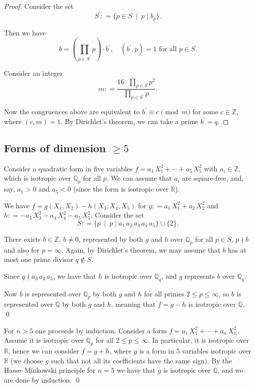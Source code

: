 \documentclass{article}
\newcommand{\dfn}{\mathrel{\mathop:}=}
\newcommand{\ZZ}{\mathbb{Z}}
\newcommand{\QQ}{\mathbb{Q}}
\theoremstyle{myplain}
\theoremstyle{mydefinition}
\begin{document}
\begin{proof}
  Consider the set
  \[ S^\prime \dfn \{ p \in S ~\mid~ p \mid b_p \}. \]

  Then we have
  \[ b = \left(\prod_{p\in S^\prime} p\right) \cdot b^\prime, \quad
    (b^\prime, p) = 1 \text{ for all } p\in S. \]

  Consider an integer
  \[ m \dfn \frac{16\cdot \prod_{p\in S} p^2}{\prod_{p\in S^\prime} p}. \]

  Now the congruences above are equivalent to $b^\prime \equiv c \pmod{m}$ for
  some $c \in \ZZ$, where $(c,m) = 1$. By Dirichlet's theorem, we can take a
  prime $b^\prime = q$.
\end{proof}

\subsection*{Forms of dimension $\ge 5$}

Consider a quadratic form in five variables
$f = a_1 \, X_1^2 + \cdots + a_5\,X_5^2$ with $a_i \in \ZZ$, which is isotropic
over $\QQ_p$ for all $p$. We can assume that $a_i$ are square-free, and, say,
$a_1 > 0$ and $a_5 < 0$ (since the form is isotropic over $\mathbb{R}$).

We have $f = g (X_1,X_2) - h (X_3,X_4,X_5)$ for $g \dfn a_1\,X_1^2 + a_2\,X_2^2$
and $h \dfn -a_3\,X_3^2 - a_4\,X_4^2 - a_5\,X_5^2$. Consider the set
\[ S \dfn \{ p ~ \mid ~ p \mid a_1 \, a_2 \, a_3 \, a_4 \, a_5 \} \cup \{ 2 \}. \]

There exists $b \in \ZZ$, $b \ne 0$, represented by both $g$ and $h$ over
$\QQ_p$ for all $p \in S$, $p \nmid b$ and also for $p = \infty$. Again, by
Dirichlet's theorem, we may assume that $b$ has at most one prime divisor
$q \notin S$.

Since $q \nmid a_3\,a_4\,a_5$, we have that $h$ is isotropic over $\QQ_q$, and
$g$ represents $b$ over $\QQ_q$.

Now $b$ is represented over $\QQ_p$ by both $g$ and $h$ for all primes
$2 \le p \le \infty$, so $b$ is represented over $\QQ$ by both $g$ and $h$,
meaning that $f = g - h$ is isotropic over $\QQ$. \qed

\vspace{1em}

For $n > 5$ one proceeds by induction. Consider a form
$f = a_1\,X_1^2 + \cdots + a_n\,X_n^2$. Assume it is isotropic over $\QQ_p$ for
all $2 \le p \le \infty$. In particular, it is isotropic over $\mathbb{R}$,
hence we can consider $f = g + h$, where $g$ is a form in $5$ variables
isotropic over $\mathbb{R}$ (we choose $g$ such that not all its coefficients
have the same sign). By the Hasse--Minkowski principle for $n = 5$ we have that
$g$ is isotropic over $\QQ$, and we are done by induction. \qed
\end{document}
